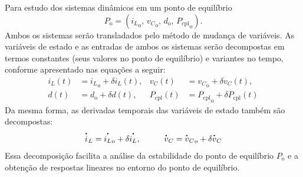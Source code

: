 Para estudo dos sistemas dinâmicos em um ponto de equilíbrio \begin{equation} P_{\mathrm{o}} = \left({i_L}_{\mathrm{o}}, \, {v_C}_{\mathrm{o}}, \, d_{\mathrm{o}}, \, {P_{\mathrm{cpl}}}_{\mathrm{o}} \right). \label{eq:operation_point} \end{equation} Ambos os sistemas serão transladados pelo método de mudança de variáveis. As variáveis de estado e as entradas de ambos os sistemas serão decompostas em termos constantes (seus valores no ponto de equilíbrio) e variantes no tempo, conforme apresentado nas equações a seguir: \begin{align}
  {i_L}(t) & = {i_L}_{\mathrm{o}} + \delta i_L(t), & {v_C}(t)     & = {v_C}_{\mathrm{o}} + \delta v_C(t), \label{eq:tranlation_decomposed_states}        \\[8pt]
  {d}(t)   & = d_{\mathrm{o}} + \delta d(t),       & {P_{\mathrm{cpl}}}(t) & = {P_{\mathrm{cpl}}}_{\mathrm{o}} + \delta P_{\mathrm{cpl}}(t) \label{eq:tranlation_decomposed_inputs}
\end{align} Da mesma forma, as derivadas temporais das variáveis de estado também são decompostas: \begin{align}
  \dt{i}_L = {\dt{i_L}}_{\mathrm{o}} + \delta \dt{i_L}, \hspace{1cm}
  \dt{v}_C = {\dt{v}_C}_{\mathrm{o}} + \delta \dt{v}_C
\end{align} Essa decomposição facilita a análise da estabilidade do ponto de equilíbrio $P_{\mathrm{o}}$ e a obtenção de respostas lineares no entorno do ponto de equilíbrio.

